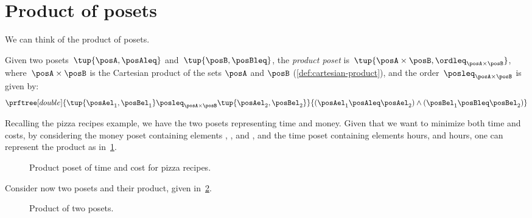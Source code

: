 

\section{Product of posets}
We can think of the product of posets.

\begin{definition}
    \label{def:productposet}
    Given two posets~$\tup{\posA, \posAleq}$
    and~$\tup{\posB, \posBleq}$, the \emph{product poset} is~$\tup{\posA \times \posB, \ordleq_{\posA\times \posB}}$, where~$\posA \times \posB$ is the Cartesian product of the sets $\posA$ and $\posB$ (\cref{def:cartesian-product}), and the order~$\posleq_{\posA \times \posB}$ is given by:
    \begin{equation}
        \prftree[double]{\tup{\posAel_1, \posBel_1}
        \posleq_{\posA\times \posB}
            \tup{\posAel_2, \posBel_2}}{(\posAel_1 \posAleq \posAel_2) \wedge
        (\posBel_1 \posBleq \posBel_2)}
    \end{equation}
\end{definition}
Recalling the pizza recipes example, we have the two posets representing time and money.
Given that we want to minimize both time and costs, by considering the money poset containing elements \unit[1]{\stdcurr}, \unit[2]{\stdcurr}, and \unit[3]{\stdcurr}, and the time poset containing elements \unit[1]{hours}, and \unit[2]{hours}, one can represent the product as in~\cref{fig:productpizza}.

\begin{figure}[h!]
    \centering
    \caption{Product poset of time and cost for pizza recipes.}
    \label{fig:productpizza}
\end{figure}




\begin{example}
    Consider now two posets and their product, given in~\cref{fig:composing_posets_1}.
    \begin{figure}[h!]
        \centering
        \caption{Product of two posets.}
        \label{fig:composing_posets_1}
    \end{figure}
\end{example}
